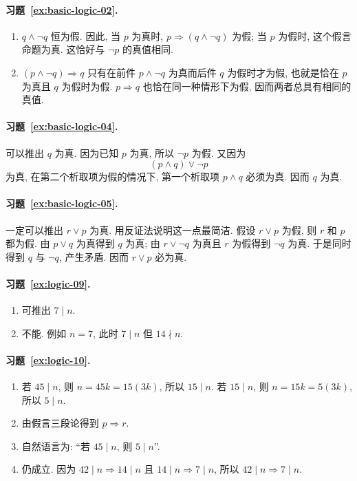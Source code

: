 \documentclass[usesamecnt, thmcnt=section, lang=cn, newtx, 10pt, scheme=chinese]{elegantbook}
\begin{document}
\paragraph*{习题~\ref{ex:basic-logic-02}.}
\begin{enumerate}[label=\rm(\arabic*)]
  \item $q\wedge\neg q$ 恒为假. 因此, 当 $p$ 为真时, $p\Rightarrow(q\wedge\neg q)$ 为假; 当 $p$ 为假时, 这个假言命题为真. 这恰好与 $\neg p$ 的真值相同.
  \item $(p\wedge\neg q)\Rightarrow q$ 只有在前件 $p\wedge\neg q$ 为真而后件 $q$ 为假时才为假, 也就是恰在 $p$ 为真且 $q$ 为假时为假. $p\Rightarrow q$ 也恰在同一种情形下为假, 因而两者总具有相同的真值.
\end{enumerate}

\paragraph*{习题~\ref{ex:basic-logic-04}.}
可以推出 $q$ 为真. 因为已知 $p$ 为真, 所以 $\neg p$ 为假. 又因为
\[
 (p\wedge q)\vee\neg p
\]
为真, 在第二个析取项为假的情况下, 第一个析取项 $p\wedge q$ 必须为真. 因而 $q$ 为真.

\paragraph*{习题~\ref{ex:basic-logic-05}.}
一定可以推出 $r\vee p$ 为真. 用反证法说明这一点最简洁. 假设 $r\vee p$ 为假, 则 $r$ 和 $p$ 都为假. 由 $p\vee q$ 为真得到 $q$ 为真; 由 $r\vee\neg q$ 为真且 $r$ 为假得到 $\neg q$ 为真. 于是同时得到 $q$ 与 $\neg q$, 产生矛盾. 因而 $r\vee p$ 必为真.

\paragraph*{习题~\ref{ex:logic-09}.}
\begin{enumerate}[label=\rm(\arabic*)]
  \item 可推出 $7\mid n$.
  \item 不能. 例如 $n=7$, 此时 $7\mid n$ 但 $14\nmid n$.
\end{enumerate}

\paragraph*{习题~\ref{ex:logic-10}.}
\begin{enumerate}[label=\rm(\arabic*)]
  \item 若 $45\mid n$, 则 $n=45k=15(3k)$, 所以 $15\mid n$. 若 $15\mid n$, 则 $n=15k=5(3k)$, 所以 $5\mid n$.
  \item 由假言三段论得到 $p\Rightarrow r$.
  \item 自然语言为: ``若 $45\mid n$, 则 $5\mid n$''.
  \item 仍成立. 因为 $42\mid n\Rightarrow14\mid n$ 且 $14\mid n\Rightarrow7\mid n$, 所以 $42\mid n\Rightarrow7\mid n$.
\end{enumerate}
\end{document}
